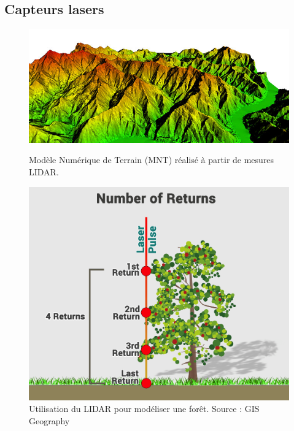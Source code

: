 \documentclass[11pt]{beamer}
\begin{document}
\subsection{Capteurs lasers}
\begin{frame}{}
\begin{figure}[!h]
\centering
\begin{minipage}[c]{.46\linewidth}
      \includegraphics[scale=0.22]{img/lidar_dem.jpg}
      \caption{Modèle Numérique de Terrain (MNT) réalisé à partir de mesures LIDAR.}
   \end{minipage} \hfill
   \begin{minipage}[c]{.46\linewidth}
      \includegraphics[scale=0.11]{img/lidar_modelisation.png}
      \caption{Utilisation du LIDAR pour modéliser une forêt. Source : GIS Geography}
   \end{minipage}
\end{figure}
\end{frame}
\end{document}
